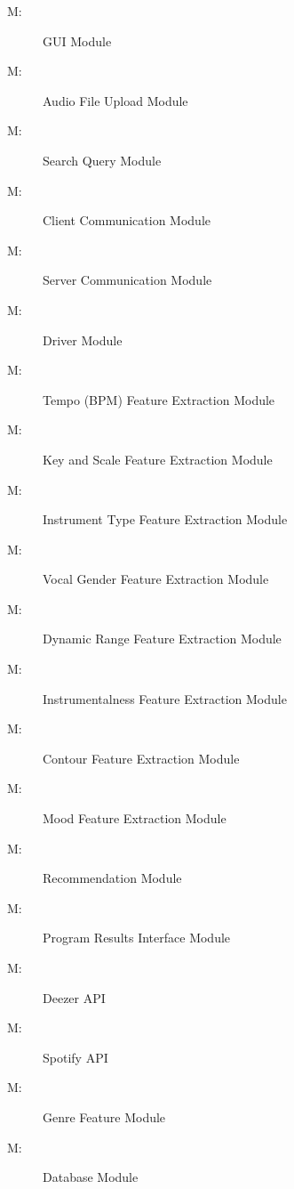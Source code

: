 \documentclass[12pt, titlepage]{article}
\newcounter{mnum}
\newcommand{\mthemnum}{M\themnum}
\begin{document}
\begin{description}
\item [ \mthemnum \label{mHH}:] GUI Module
\item [ \mthemnum \label{mHH}:] Audio File Upload Module
\item [ \mthemnum \label{mHH}:] Search Query Module
\item [ \mthemnum \label{mHH}:] Client Communication Module

\item [ \mthemnum \label{mHH}:] Server Communication Module
\item [ \mthemnum \label{mHH}:] Driver Module


\item [ \mthemnum \label{mHH}:] Tempo (BPM) Feature Extraction Module
\item [ \mthemnum \label{mHH}:] Key and Scale Feature Extraction Module
\item [ \mthemnum \label{mHH}:] Instrument Type Feature Extraction Module
\item [ \mthemnum \label{mHH}:] Vocal Gender Feature Extraction Module
\item [ \mthemnum \label{mHH}:] Dynamic Range Feature Extraction Module
\item [ \mthemnum \label{mHH}:] Instrumentalness Feature Extraction Module
\item [ \mthemnum \label{mHH}:] Contour Feature Extraction Module
\item [ \mthemnum \label{mHH}:] Mood Feature Extraction Module
%
\item [ \mthemnum \label{mHH}:] Recommendation Module
\item [ \mthemnum \label{mHH}:] Program Results Interface Module

\item [ \mthemnum \label{mHH}:] Deezer API
\item [ \mthemnum \label{mHH}:] Spotify API
\item [ \mthemnum \label{mHH}:] Genre Feature Module
\item [ \mthemnum \label{mHH}:] Database Module
\end{description}
\end{document}
